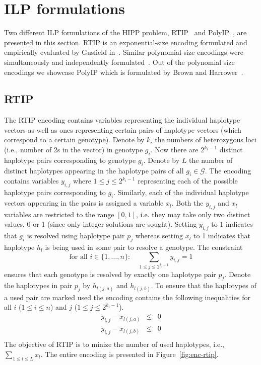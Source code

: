 \documentclass[12pt,a4paper]{article}
\begin{document}
\section{ILP formulations}
\label{sec:ilp-hipp}
Two different ILP formulations of the HIPP problem, RTIP~\cite{DBLP:conf/cpm/Gusfield03} and PolyIP~\cite{DBLP:journals/tcbb/BrownH06}, are presented in this section.
RTIP is an exponential-size encoding formulated and empirically evaluated by Gusfield in~\cite{DBLP:conf/cpm/Gusfield03}.
Similar polynomial-size encodings were simultaneously and independently formulated~\cite{DBLP:journals/tcbb/BrownH06, DBLP:conf/recomb/HalldorssonBELYI02, DBLP:journals/informs/LanciaPR04}.
Out of the polynomial size encodings we showcase PolyIP which is formulated by Brown and Harrower~\cite{DBLP:journals/tcbb/BrownH06}.

\subsection{RTIP}

The RTIP encoding contains variables representing the individual haplotype vectors as well as ones representing certain pairs of haplotype vectors (which correspond to a certain genotype).
Denote by $k_i$ the numbers of heterozygous loci (i.e., number of 2s in the vector) in genotype $g_i$.
Now there are $2^{k_i-1}$ distinct haplotype pairs corresponding to genotype $g_i$.
Denote by $L$ the number of distinct haplotypes appearing in the haplotype pairs of all $g_i\in\mathcal{G}$.
The encoding contains variables $y_{i,j}$ where $1\leq j \leq 2^{k_i-1}$ representing each of the possible haplotype pairs corresponding to $g_i$.
Similarly, each of the individual haplotype vectors appearing in the pairs is assigned a variable $x_l$.
Both the $y_{i,j}$ and $x_l$ variables are restricted to the range $[0,1]$, i.e. they may take only two distinct values, 0 or 1 (since only integer solutions are sought).
Setting $y_{i,j}$ to 1 indicates that $g_i$ is resolved using haplotype pair $p_j$ whereas 
setting $x_l$ to 1 indicates that haplotype $h_l$ is being used in some pair to resolve a genotype.
The constraint
$$ \text{for all  }i\in\{1,\dots , n\}:\quad \sum_{1\leq j \leq 2^{k_i-1}} y_{i,j} = 1 $$
ensures that each genotype is resolved by exactly one haplotype pair $p_j$.
Denote the haplotypes in pair $p_j$ by $h_{l(j,a)}$ and $h_{l(j,b)}$.
To ensure that the haplotypes of a used pair are marked used the encoding contains the following inequalities for all $i$ ($1\leq i \leq n$) and $j$ ($1\leq j \leq 2^{k_i-1}$).
\begin{eqnarray*}
y_{i,j} - x_{l(j,a)} & \leq & 0 \\
y_{i,j} - x_{l(j,b)} & \leq & 0 \\
\end{eqnarray*}
The objective of RTIP is to minize the number of used haplotypes, i.e., $\sum_{1\leq l \leq L} x_l$.
The entire encoding is presented in Figure~\ref{fig:enc-rtip}.
\end{document}
